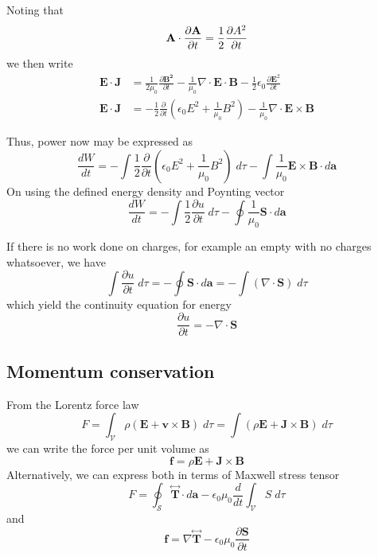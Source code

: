 \documentclass[../../../main.tex]{subfiles}
\begin{document}
Noting that
\begin{equation*}
    \mathbf{A}\cdot\frac{\partial\mathbf{A}}{\partial t}=\frac{1}{2}\frac{\partial A^2}{\partial t}
\end{equation*}
we then write
\begin{align*}
    \mathbf{E}\cdot\mathbf{J} & =\frac{1}{2\mu_0}\frac{\partial \mathbf{B^2}}{\partial t} -\frac{1}{\mu_0}\nabla\cdot\mathbf{E}\cdot\mathbf{B} -\frac{1}{2}\epsilon_0\frac{\partial \mathbf{E}^2}{\partial t} \\
    \mathbf{E}\cdot\mathbf{J} & =-\frac{1}{2}\frac{\partial}{\partial t}\left(\epsilon_0E^2+\frac{1}{\mu_0}B^2\right)-\frac{1}{\mu_0}\nabla\cdot\mathbf{E}\times\mathbf{B}
\end{align*}

Thus, power now may be expressed as
\begin{equation*}
    \frac{dW}{dt}=-\int\frac{1}{2}\frac{\partial}{\partial t}\left(\epsilon_0E^2+\frac{1}{\mu_0}B^2\right)\;d\tau -\int\frac{1}{\mu_0}\mathbf{E}\times\mathbf{B}\cdot d\mathbf{a}
\end{equation*}
On using the defined energy density and Poynting vector
\begin{equation*}
    \frac{dW}{dt}=-\int\frac{1}{2}\frac{\partial u}{\partial t}\;d\tau -\oint\frac{1}{\mu_0}\mathbf{S}\cdot d\mathbf{a}
\end{equation*}

If there is no work done on charges, for example an empty with no charges whatsoever, we have
\begin{equation*}
    \int \frac{\partial u}{\partial t}\;d\tau=-\oint \mathbf{S}\cdot d\mathbf{a}= -\int(\nabla\cdot\mathbf{S})\;d\tau
\end{equation*}
which yield the continuity equation for energy
\begin{equation*}
    \frac{\partial u}{\partial t}=-\nabla\cdot\mathbf{S}
\end{equation*}

\subsection{Momentum conservation}
From the Lorentz force law
\begin{equation*}
    F=\int_\mathcal{V}\rho(\mathbf{E}+\mathbf{v}\times\mathbf{B})\;d\tau= \int(\rho\mathbf{E}+\mathbf{J}\times\mathbf{B})\;d\tau
\end{equation*}
we can write the force per unit volume as
\begin{equation*}
    \mathbf{f}=\rho\mathbf{E}+\mathbf{J}\times\mathbf{B}
\end{equation*}
Alternatively, we can express both in terms of Maxwell stress tensor
\begin{equation*}
    F=\oint_\mathcal{S}\stackrel{\leftrightarrow}{\mathbf{T}}\cdot d\mathbf{a}-\epsilon_0\mu_0\frac{d}{dt}\int_\mathcal{V}S\;d\tau
\end{equation*}
and
\begin{equation*}
    \mathbf{f}=\nabla\stackrel{\leftrightarrow}{\mathbf{T}}-\epsilon_0\mu_0\frac{\partial \mathbf{S}}{\partial t}
\end{equation*}
\end{document}
